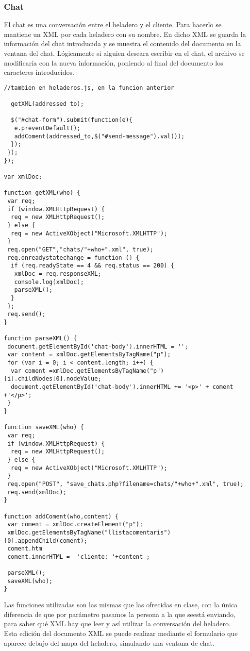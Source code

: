 \documentclass[11pt,a4paper]{article}
\begin{document}
\subsubsection{Chat}
El chat es una conversación entre el heladero y el cliente. Para hacerlo se mantiene un XML por cada heladero con su nombre. En dicho XML se guarda la información del chat introducida y se muestra el contenido del documento en la ventana del chat. Lógicamente si alguien deseara escribir en el chat, el archivo se modificaría con la nueva información, poniendo al final del documento los caracteres introducidos.\\
\begin{lstlisting}
//tambien en heladeros.js, en la funcion anterior

  getXML(addressed_to);

  $("#chat-form").submit(function(e){
   e.preventDefault();
   addComent(addressed_to,$("#send-message").val());
  });
 });
}); 
 
var xmlDoc;

function getXML(who) {
 var req;
 if (window.XMLHttpRequest) {
  req = new XMLHttpRequest();
 } else {
  req = new ActiveXObject("Microsoft.XMLHTTP");
 }
 req.open("GET","chats/"+who+".xml", true);
 req.onreadystatechange = function () {
  if (req.readyState == 4 && req.status == 200) {
   xmlDoc = req.responseXML;
   console.log(xmlDoc);
   parseXML();
  }
 };
 req.send();
}

function parseXML() {
 document.getElementById('chat-body').innerHTML = '';
 var content = xmlDoc.getElementsByTagName("p");
 for (var i = 0; i < content.length; i++) {
  var coment =xmlDoc.getElementsByTagName("p")[i].childNodes[0].nodeValue;
  document.getElementById('chat-body').innerHTML += '<p>' + coment +'</p>';
 }
}

function saveXML(who) {
 var req;
 if (window.XMLHttpRequest) {
  req = new XMLHttpRequest();
 } else {
  req = new ActiveXObject("Microsoft.XMLHTTP");
 }
 req.open("POST", "save_chats.php?filename=chats/"+who+".xml", true);
 req.send(xmlDoc);
}

function addComent(who,content) {
 var coment = xmlDoc.createElement("p");
 xmlDoc.getElementsByTagName("llistacomentaris")[0].appendChild(coment);
 coment.htm
 coment.innerHTML =  'cliente: '+content ;

 parseXML();
 saveXML(who);
}

\end{lstlisting}
Las funciones utilizadas son las mismas que las ofrecidas en clase, con la única diferencia de que por parámetro pasamos la persona a la que seestá enviando, para saber qué XML hay que leer y así utilizar la conversación del heladero.\\
Esta edición del documento XML se puede realizar mediante el formulario que aparece debajo del mapa del heladero, simulando una ventana de chat.
\end{document}
